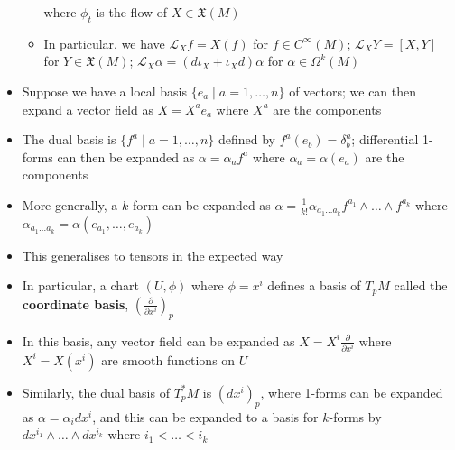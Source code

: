 \documentclass[12pt,a4paper]{article}
\numberwithin{equation}{section}
\begin{document}
\begin{itemize}
\begin{itemize}
			where $\phi_{t}$ is the flow of $X\in\mathfrak{X}(M)$
			\item In particular, we have $\mathcal{L}_{X}f=X(f)$ for $f\in C^{\infty}(M)$; $\mathcal{L}_{X}Y=[X,Y]$ for $Y\in\mathfrak{X}(M)$; $\mathcal{L}_{X}\alpha=(d\iota_{X}+\iota_{X}d)\alpha$ for $\alpha\in\Omega^{k}(M)$
		\end{itemize}
		\item Suppose we have a local basis $\{e_{a}\;|\;a=1,\ldots,n\}$ of vectors; we can then expand a vector field as $X=X^{a}e_{a}$ where $X^{a}$ are the components
		\item The dual basis is $\{f^{a}\;|\;a=1,\ldots,n\}$ defined by $f^{a}(e_{b})=\delta^{a}_{b}$; differential 1-forms can then be expanded as $\alpha=\alpha_{a}f^{a}$ where $\alpha_{a}=\alpha(e_{a})$ are the components
		\item More generally, a $k$-form can be expanded as $\alpha=\frac{1}{k!}\alpha_{a_{1}\ldots a_{k}}f^{a_{1}}\wedge\ldots\wedge f^{a_{k}}$ where $\alpha_{a_{1}\ldots a_{k}}=\alpha(e_{a_{1}},\ldots,e_{a_{k}})$
		\item This generalises to tensors in the expected way
		\item In particular, a chart $(U,\phi)$ where $\phi=x^{i}$ defines a basis of $T_{p}M$ called the \textbf{coordinate basis}, $\left(\frac{\partial}{\partial x^{i}}\right)_{p}$
		\item In this basis, any vector field can be expanded as $X=X^{i}\frac{\partial}{\partial x^{i}}$ where $X^{i}=X(x^{i})$ are smooth functions on $U$
		\item Similarly, the dual basis of $T_{p}^{*}M$ is $(dx^{i})_{p}$, where 1-forms can be expanded as $\alpha=\alpha_{i}dx^{i}$, and this can be expanded to a basis for $k$-forms by $dx^{i_{1}}\wedge\ldots\wedge dx^{i_{k}}$ where $i_{1}<\ldots<i_{k}$
	\end{itemize}
\newpage
\end{document}
